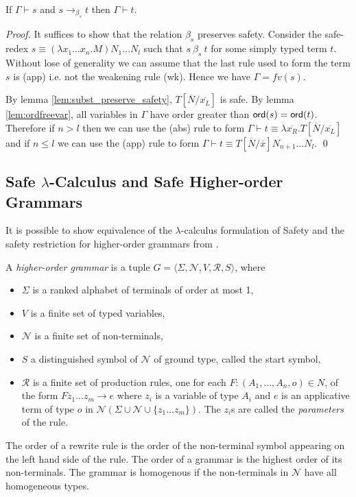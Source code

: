 \documentclass{llncs}
\newcommand\betasred{\rightarrow_{\beta_s}}
\newcommand\subst[2]{\left[ #1/#2 \right]}
\newcommand\ord[1]{{\sf ord}(#1)}
\newcommand\union{\cup}
\begin{document}
\begin{lemma}
\label{lem:homoh_safered_preserve_safety}
If $\Gamma \vdash s$ and $s \betasred t$ then $\Gamma \vdash t$.
\end{lemma}

\begin{proof}
It suffices to show that the relation $\beta_s$ preserves safety.
Consider the safe-redex $ s \equiv (\lambda x_1 \ldots x_n . M) N_1 \ldots N_l $ such that
$s\ \beta_s\ t$ for some simply typed term $t$.
Without lose of generality we can assume that the last rule used to form the term $s$ is {\sf(app)} i.e. not the weakening rule
{\sf(wk)}. Hence we have $\Gamma = fv(s)$.

By lemma \ref{lem:subst_preserve_safety}, $T\subst{\overline{N}}{\overline{x_L}}$ is safe.
By lemma \ref{lem:ordfreevar}, all variables in $\Gamma$ have order greater than $\ord{s} = \ord{t}$. Therefore
if $n>l$ then we can use the {\sf(abs)} rule to form $\Gamma \vdash t \equiv \lambda \overline{x_R}. T\subst{\overline{N}}{\overline{x_L}}$
and if $n \leq l$ we can use the {\sf(app)} rule to form $\Gamma \vdash t \equiv  T\subst{\overline{N}}{\overline{x}} N_{n+1} \ldots N_l$.
\qed
\end{proof}


\subsection{Safe $\lambda$-Calculus and Safe Higher-order Grammars}
It is possible to show equivalence of the $\lambda$-calculus formulation of Safety and the
safety restriction for higher-order grammars from \cite{KNU02}.
\begin{definition}
A \emph{higher-order grammar} is a tuple $G =
\langle \Sigma, \mathcal{N}, V, \mathcal{R}, S \rangle$, where
\begin{itemize}
\item $\Sigma$ is a ranked alphabet of terminals of order at most 1,
\item $V$ is a finite set of typed variables,
\item $\mathcal{N}$ is a finite set of non-terminals,
\item $S$ a distinguished symbol of $\mathcal{N}$ of ground type, called the start symbol,
\item $\mathcal{R}$ is a finite set of production rules, one for each $F : (A_1, \ldots, A_n, o) \in N$, of the form
$ F z_1 \ldots z_m \rightarrow e$
where $z_i$ is a variable of type $A_i$ and $e$ is an applicative
term of type $o$ in $\mathcal{N}(\Sigma \union \mathcal{N} \union
\{z_1 \ldots z_m \} )$. The $z_i$s are called the \emph{parameters}
of the rule.
\end{itemize}
\end{definition}
The order of a rewrite rule is the order of the non-terminal symbol
appearing on the left hand side of the rule. The order of a grammar
is the highest order of its non-terminals.
The grammar is homogenous if the non-terminals in $\mathcal{N}$ have all homogeneous types.
\end{document}
